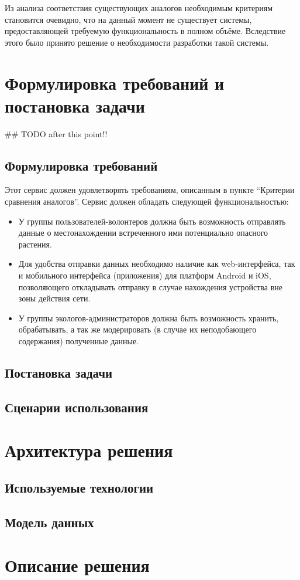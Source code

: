 \nwln
Из анализа соответствия существующих аналогов необходимым критериям становится очевидно, что на данный момент не существует системы, предоставляющей требуемую функциональность в полном объёме.
Вследствие этого было принято решение о необходимости разработки такой системы.

\section{Формулировка требований и постановка задачи}

\#\# TODO after this point!!

\subsection{Формулировка требований}

Этот сервис должен удовлетворять требованиям, описанным в пункте “Критерии сравнения аналогов”.
Сервис должен обладать следующей функциональностью:
\begin{itemize}[topsep=0pt, parsep=0pt, itemsep=0pt, wide=0.5cm]
	\item У группы пользователей-волонтеров должна быть возможность отправлять данные о местонахождении встреченного ими потенциально опасного растения.
	\item Для удобства отправки данных необходимо наличие как web-интерфейса, так и мобильного интерфейса (приложения) для платформ Android и iOS, позволяющего откладывать отправку в случае нахождения устройства вне зоны действия сети.
	\item У группы экологов-администраторов должна быть возможность хранить, обрабатывать, а так же модерировать (в случае их неподобающего содержания) полученные данные.
\end{itemize}

\subsection{Постановка задачи}

\subsection{Сценарии использования}

\section{Архитектура решения}

\subsection{Используемые технологии}

\subsection{Модель данных}

\section{Описание решения}
